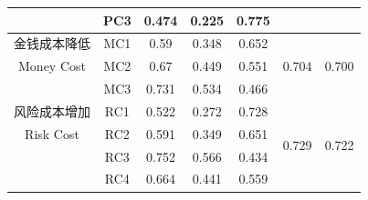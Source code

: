 \documentclass[12pt,UTF8]{ctexart}
\begin{document}
\begin{spacing}{1.25}
\begin{table}[H]
\begin{tabular}{@{}ccccccc@{}}
            & PC3           & 0.474                                                                & 0.225                                                                 & 0.775                                                                    &                        &                              \\ \midrule
金钱成本降低      & MC1           & 0.59                                                                 & 0.348                                                                 & 0.652                                                                    &                        &                              \\
Money Cost          & MC2           & 0.67                                                                 & 0.449                                                                 & 0.551                                                                    & 0.704                  & 0.700                        \\
            & MC3           & 0.731                                                                & 0.534                                                                 & 0.466                                                                    &                        &                              \\ \midrule
风险成本增加      & RC1           & 0.522                                                                & 0.272                                                                 & 0.728                                                                    & \multirow{4}{*}{0.729} & \multirow{4}{*}{0.722}       \\
Risk Cost          & RC2           & 0.591                                                                & 0.349                                                                 & 0.651                                                                    &                        &                              \\
            & RC3           & 0.752                                                                & 0.566                                                                 & 0.434                                                                    &                        &                              \\
            & RC4           & 0.664                                                                & 0.441                                                                 & 0.559                                                                    &                        &                              \\ \midrule

\end{tabular}
\end{table}
\end{spacing}
\end{document}
